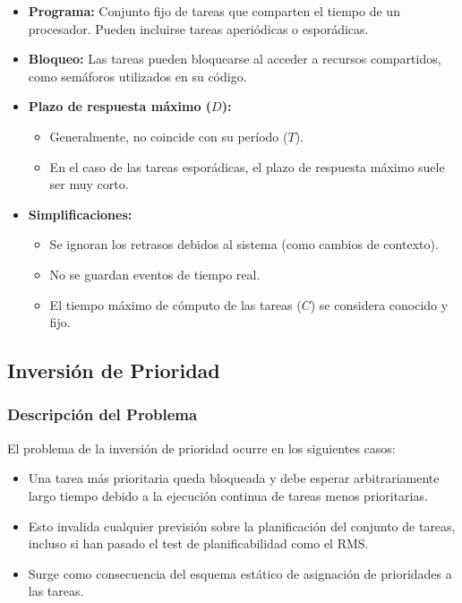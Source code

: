 \documentclass[a4paper,12pt]{article}
\begin{document}
\begin{itemize}
    \item \textbf{Programa:} Conjunto fijo de tareas que comparten el tiempo de un procesador. Pueden incluirse tareas aperiódicas o esporádicas.
    \item \textbf{Bloqueo:} Las tareas pueden bloquearse al acceder a recursos compartidos, como semáforos utilizados en su código.
    \item \textbf{Plazo de respuesta máximo (\(D\)):} 
    \begin{itemize}
        \item Generalmente, no coincide con su período (\(T\)).
        \item En el caso de las tareas esporádicas, el plazo de respuesta máximo suele ser muy corto.
    \end{itemize}
    \item \textbf{Simplificaciones:}
    \begin{itemize}
        \item Se ignoran los retrasos debidos al sistema (como cambios de contexto).
        \item No se guardan eventos de tiempo real.
        \item El tiempo máximo de cómputo de las tareas (\(C\)) se considera conocido y fijo.
    \end{itemize}
\end{itemize}

\subsection{Inversión de Prioridad}

\subsubsection{Descripción del Problema}

El problema de la inversión de prioridad ocurre en los siguientes casos:

\begin{itemize}
    \item Una tarea más prioritaria queda bloqueada y debe esperar arbitrariamente largo tiempo debido a la ejecución continua de tareas menos prioritarias.
    \item Esto invalida cualquier previsión sobre la planificación del conjunto de tareas, incluso si han pasado el test de planificabilidad como el RMS.
    \item Surge como consecuencia del esquema estático de asignación de prioridades a las tareas.
\end{itemize}
\end{document}
